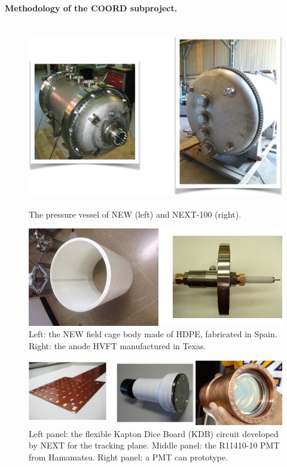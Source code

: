 \paragraph{Methodology of the COORD subproject.}

\begin{figure}
\centering
\includegraphics[height=8cm]{img/PV.jpg}
\caption{The pressure vessel of NEW (left) and NEXT-100 (right).} \label{fig:PV}
\end{figure}

\begin{figure}[t!b!]
\begin{center}
\includegraphics[width=.9\textwidth]{img/FC3.jpg}
\end{center}
\caption{\small Left: the NEW field cage body made of HDPE, fabricated in Spain. Right: the anode HVFT manufactured in Texas.
} \label{fig:FC}
\end{figure}

\begin{figure}[t!b!]
\begin{center}
\includegraphics[width=.9\textwidth]{img/KDBandPMT.jpg}
\end{center}
\caption{\small Left panel: the flexible Kapton Dice Board (KDB) circuit developed by NEXT for the tracking plane. Middle panel: the R11410-10 PMT from Hamamatsu. Right panel: a PMT can prototype.} \label{fig:sensors}
\end{figure}

